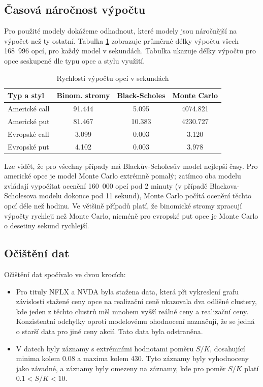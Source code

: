 \documentclass[male,czech,api_bc]{kitheses}
\begin{document}
  \subsection{Časová náročnost výpočtu}

  Pro použité modely dokážeme odhadnout, které modely jsou náročnější na výpočet než ty ostatní. Tabulka \ref{tab:model_speeds} zobrazuje průměrné délky výpočtu všech 168~996 opcí, pro každý model v sekundách. Tabulka ukazuje délky výpočtu pro opce seskupené dle typu opce a stylu využití.

  \begin{table}[h!]
    \centering
    \caption{Rychlosti výpočtu opcí v sekundách}
    \label{tab:model_speeds}
    \begin{tabular}{lccc}
      \toprule
      Typ a styl & Binom. stromy & Black-Scholes & Monte Carlo \\
      \midrule
      Americké call & 91.444 & 5.095 & 4074.821 \\
      Americké put & 81.467 & 10.383 & 4230.727 \\
      Evropské call & 3.099 & 0.003 & 3.120 \\
      Evropské put & 4.102 & 0.003 & 3.978 \\
      \bottomrule
    \end{tabular}
  \end{table}

  Lze vidět, že pro všechny případy má Blackův-Scholesův model nejlepší časy. Pro americké opce je model Monte Carlo extrémně pomalý; zatímco oba modelu zvládají vypočítat ocenění 160~000 opcí pod 2 minuty (v případě Blackova-Scholesova modelu dokonce pod 11 sekund), Monte Carlo počítá ocenění těchto opcí déle než hodinu.
  Ve většině případů platí, že binomické stromy zpracují výpočty rychleji než Monte Carlo, nicméně pro evropské put opce je Monte Carlo o desetiny sekund rychlejší. 

  \subsection{Očištění dat}

  Očištění dat spočívalo ve dvou krocích:

  \begin{itemize}
    \item{Pro tituly NFLX a NVDA byla stažena data, která při vykreslení grafu závislosti stažené ceny opce na realizační ceně ukazovala dva odlišné clustery, kde jeden z těchto clustrů měl mnohem vyšší reálné ceny a realizační ceny. Konzistentní odchylky oproti modelovému ohodnocení naznačují, že se jedná o starší data pro jiné ceny akcií. Tato data byla odstraněna.}
    \item{V datech byly záznamy s extrémními hodnotami poměru $S/K$, dosahující minima kolem 0.08 a maxima kolem 430. Tyto záznamy byly vyhodnoceny jako závadné, a záznamy byly omezeny na záznamy, kde pro poměr $S/K$ platí $0.1 < S/K < 10$. }
  \end{itemize}
\end{document}
